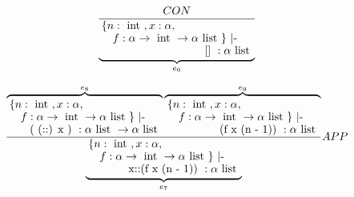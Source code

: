 \begin{equation}
	\frac
	{
		CON
	} 
        {
        	      \underbrace{
        			\splitfrac
			{
        				\splitfrac
				{
					\{ n: \tauthree, x: \tautwo,
                         		}
                	        		{
 					f: \tauone \} \text{ |- }                         		
 				}
                         }
                	        {
                                 \text{ [] }: \taufour
                         }
               }_{e_6}
	}
\end{equation}

\begin{equation}
	\frac
	{
        	      \overbrace{
        			\splitfrac
			{
        				\splitfrac
				{
					\{ n: \tauthree, x: \tautwo,
                         		}
                	        		{
 					f: \tauone \} \text{ |- }                         		
 				}
                         }
                	        {
                                 \text{ ( (::) x ) }: \taufour \rightarrow \taufour
                         }
               }^{e_8}
        	      \overbrace{
        			\splitfrac
			{
        				\splitfrac
				{
					\{ n: \tauthree, x: \tautwo,
                         		}
                	        		{
 					f: \tauone \} \text{ |- }                         		
 				}
                         }
                	        {
                                 \text{ (f x (n - 1)) }: \taufour
                         }
               }^{e_9}
	} 
        {
        	      \underbrace{
        			\splitfrac
			{
        				\splitfrac
				{
					\{ n: \tauthree, x: \tautwo,
                         		}
                	        		{
 					f: \tauone \} \text{ |- }                         		
 				}
                         }
                	        {
                                 \text{ x::(f x (n - 1)) }: \taufour
                         }
               }_{e_7}
	}
        {
            APP
        }
\end{equation}

